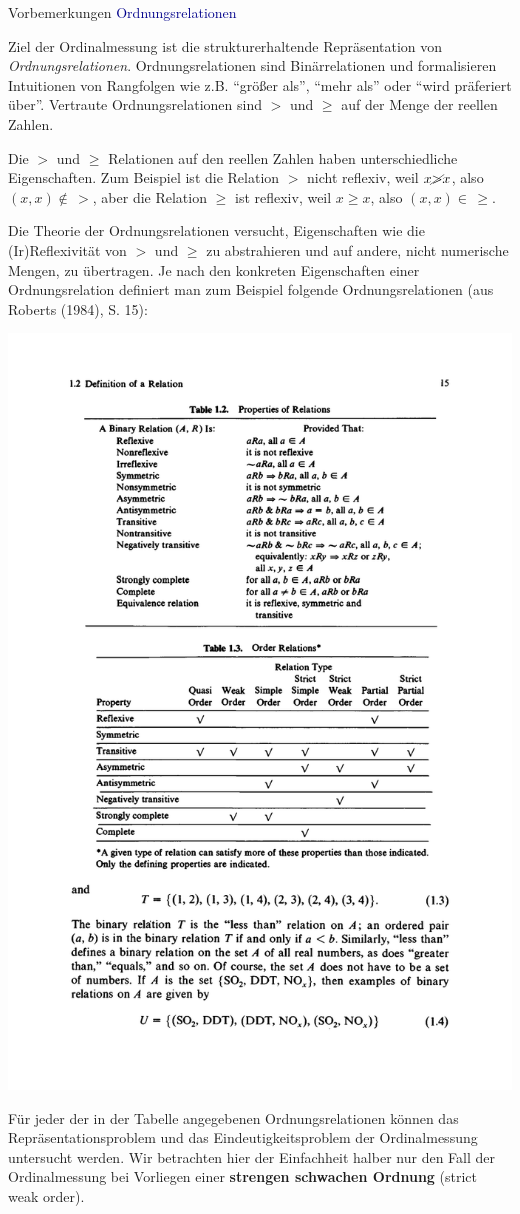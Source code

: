 \documentclass[
  8pt,
  ignorenonframetext,
]{beamer}
\begin{document}
\begin{frame}{Vorbemerkungen}
\protect\hypertarget{vorbemerkungen-2}{}
\textcolor{darkblue}{Ordnungsrelationen}

\footnotesize

Ziel der Ordinalmessung ist die strukturerhaltende Repräsentation von
\emph{Ordnungsrelationen}. Ordnungsrelationen sind Binärrelationen und
formalisieren Intuitionen von Rangfolgen wie z.B. ``größer als'', ``mehr
als'' oder ``wird präferiert über''. Vertraute Ordnungsrelationen sind
\(>\) und \(\ge\) auf der Menge der reellen Zahlen.

Die \(>\) und \(\ge\) Relationen auf den reellen Zahlen haben
unterschiedliche Eigenschaften. Zum Beispiel ist die Relation \(>\)
nicht reflexiv, weil \(x \cancel{>} x\), also \((x,x) \notin \, >\),
aber die Relation \(\ge\) ist reflexiv, weil \(x \ge x\), also
\((x,x) \in\, \ge\).

Die Theorie der Ordnungsrelationen versucht, Eigenschaften wie die
(Ir)Reflexivität von \(>\) und \(\ge\) zu abstrahieren und auf andere,
nicht numerische Mengen, zu übertragen. Je nach den konkreten
Eigenschaften einer Ordnungsrelation definiert man zum Beispiel folgende
Ordnungsrelationen (aus Roberts (1984), S. 15):

\begin{center}\includegraphics[width=0.4\linewidth]{8_Abbildungen/pfm_8_order_relations} \end{center}

Für jeder der in der Tabelle angegebenen Ordnungsrelationen können das
Repräsentationsproblem und das Eindeutigkeitsproblem der Ordinalmessung
untersucht werden. Wir betrachten hier der Einfachheit halber nur den
Fall der Ordinalmessung bei Vorliegen einer \textbf{strengen schwachen
Ordnung} (strict weak order).
\end{frame}
\end{document}
